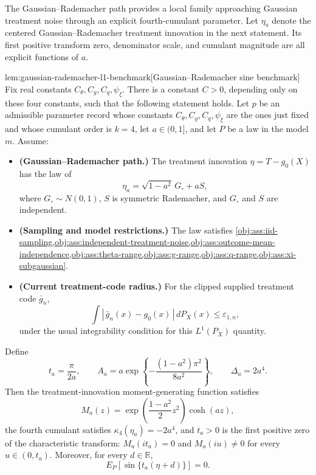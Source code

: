 \documentclass[11pt]{article}
\begin{document}
The Gaussian--Rademacher path provides a local family approaching Gaussian treatment noise through an explicit fourth-cumulant parameter. Let \(\eta_a\) denote the centered Gaussian--Rademacher treatment innovation in the next statement. Its first positive transform zero, denominator scale, and cumulant magnitude are all explicit functions of \(a\).

\begin{lemmav}{lem:gaussian-rademacher-l1-benchmark}[Gaussian--Rademacher sine benchmark]
Fix real constants \(C_{\theta},C_g,C_q,\psi_{\xi}\).  There is a constant \(C>0\), depending only on these four constants, such that the following statement holds.  Let \(p\) be an admissible parameter record whose constants \(C_{\theta},C_g,C_q,\psi_{\xi}\) are the ones just fixed and whose cumulant order is \(k=4\), let \(a\in(0,1]\), and let \(P\) be a law in the model \(m\).  Assume:
\begin{itemize}
\item \textbf{(Gaussian--Rademacher path.)} The treatment innovation \(\eta=T-g_0(X)\) has the law of
\[
\eta_a=\sqrt{1-a^2}\,G_{\circ}+aS,
\]
where \(G_{\circ}\sim N(0,1)\), \(S\) is symmetric Rademacher, and \(G_{\circ}\) and \(S\) are independent.
\item \textbf{(Sampling and model restrictions.)} The law satisfies \cref{obj:ass:iid-sampling,obj:ass:independent-treatment-noise,obj:ass:outcome-mean-independence,obj:ass:theta-range,obj:ass:g-range,obj:ass:q-range,obj:ass:xi-subgaussian}.
\item \textbf{(Current treatment-code radius.)} For the clipped supplied treatment code \(\bar g_n\),
\[
\int |\,\bar g_n(x)-g_0(x)\,|\,dP_X(x)\le \varepsilon_{1,n},
\]
under the usual integrability condition for this \(L^1(P_X)\) quantity.
\end{itemize}
Define
\[
t_a=\frac{\pi}{2a},\qquad
A_a=a\exp\!\left\{-\frac{(1-a^2)\pi^2}{8a^2}\right\},\qquad
\Delta_a=2a^4.
\]
Then the treatment-innovation moment-generating function satisfies
\[
M_a(z)=\exp\!\left(\frac{1-a^2}{2}z^2\right)\cosh(az),
\]
the fourth cumulant satisfies \(\kappa_4(\eta_a)=-2a^4\), and \(t_a>0\) is the first positive zero of the characteristic transform: \(M_a(it_a)=0\) and \(M_a(iu)\ne0\) for every \(u\in(0,t_a)\).  Moreover, for every \(d\in\mathbb R\),
\[
E_P[\sin\{t_a(\eta+d)\}]=0.
\]


\end{lemmav}
\end{document}
